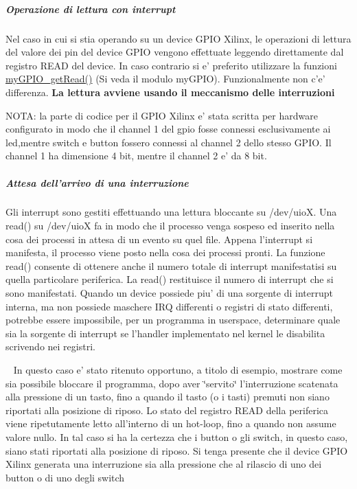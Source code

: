 \subparagraph*{Operazione di lettura con interrupt}

Nel caso in cui si stia operando su un device G\+P\+I\+O Xilinx, le operazioni di lettura del valore dei pin del device G\+P\+I\+O vengono effettuate leggendo direttamente dal registro R\+E\+A\+D del device. In caso contrario si e' preferito utilizzare la funzioni \hyperlink{group__my_g_p_i_o_gadb3ecd03ea82420488977134c9313e18}{my\+G\+P\+I\+O\+\_\+get\+Read()} (Si veda il modulo my\+G\+P\+I\+O). Funzionalmente non c'e' differenza. {\bfseries La lettura avviene usando il meccanismo delle interruzioni}

N\+O\+T\+A\+: la parte di codice per il G\+P\+I\+O Xilinx e' stata scritta per hardware configurato in modo che il channel 1 del gpio fosse connessi esclusivamente ai led,mentre switch e button fossero connessi al channel 2 dello stesso G\+P\+I\+O. Il channel 1 ha dimensione 4 bit, mentre il channel 2 e' da 8 bit.

\subparagraph*{Attesa dell'arrivo di una interruzione}

Gli interrupt sono gestiti effettuando una lettura bloccante su /dev/uio\+X. Una read() su /dev/uio\+X fa in modo che il processo venga sospeso ed inserito nella cosa dei processi in attesa di un evento su quel file. Appena l'interrupt si manifesta, il processo viene posto nella cosa dei processi pronti. La funzione read() consente di ottenere anche il numero totale di interrupt manifestatisi su quella particolare periferica. La read() restituisce il numero di interrupt che si sono manifestati. Quando un device possiede piu' di una sorgente di interrupt interna, ma non possiede maschere I\+R\+Q differenti o registri di stato differenti, potrebbe essere impossibile, per un programma in userspace, determinare quale sia la sorgente di interrupt se l'handler implementato nel kernel le disabilita scrivendo nei registri.

~\newline
 In questo caso e' stato ritenuto opportuno, a titolo di esempio, mostrare come sia possibile bloccare il programma, dopo aver \char`\"{}servito\char`\"{} l'interruzione scatenata alla pressione di un tasto, fino a quando il tasto (o i tasti) premuti non siano riportati alla posizione di riposo. Lo stato del registro R\+E\+A\+D della periferica viene ripetutamente letto all'interno di un hot-\/loop, fino a quando non assume valore nullo. In tal caso si ha la certezza che i button o gli switch, in questo caso, siano stati riportati alla posizione di riposo. Si tenga presente che il device G\+P\+I\+O Xilinx generata una interruzione sia alla pressione che al rilascio di uno dei button o di uno degli switch

